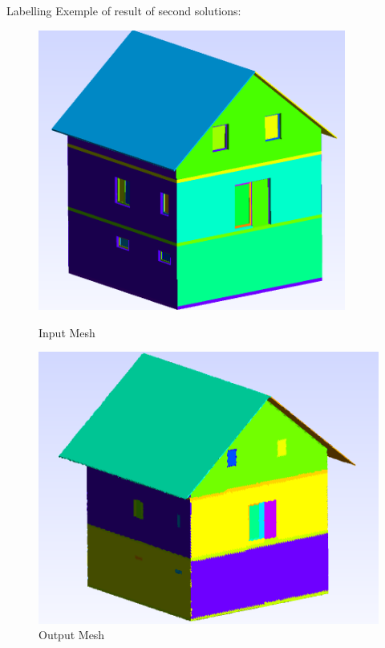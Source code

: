 \documentclass[10pt]{beamer}
\begin{document}
\begin{frame}{Labelling}
    Exemple of result of second solutions:
    \begin{figure}
        \centering
        \begin{minipage}{0.5\textwidth}
            \centering
            \includegraphics[width=0.9\textwidth]{../image/ACJasmin_1.png}
            \caption{Input Mesh}
            \label{fig:input_mesh}
        \end{minipage}%
        \begin{minipage}{0.5\textwidth}
            \centering
            \includegraphics[width=1.05\textwidth]{../image/ACjasmin_label.png}
            \caption{Output Mesh}
            \label{fig:output_mesh}
        \end{minipage}
    \end{figure}
\end{frame}
\end{document}
